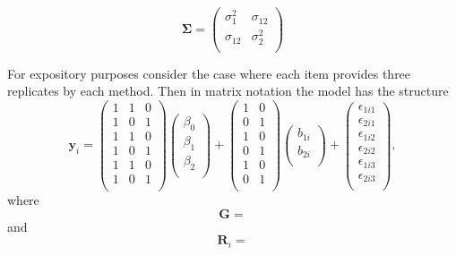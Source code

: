 \documentclass[12pt, a4paper]{report}
\theoremstyle{plain}
\theoremstyle{definition}
\theoremstyle{remark}
\begin{document}
\begin{equation}
\boldsymbol{\Sigma} = \left( \begin{array}{cc}
\sigma^2_{1} & \sigma_{12} \\
\sigma_{12} & \sigma^2_{2} \\
\end{array}\right)
\end{equation}

\vspace{1in}

For expository purposes consider the case where each item provides three replicates by each method. Then in matrix notation the model has the structure
\begin{equation}
\boldsymbol{y}_{i} =
\left(
\begin{array}{ccc}
1 & 1 & 0 \\
1 & 0 & 1 \\
1 & 1 & 0 \\
1 & 0 & 1 \\
1 & 1 & 0 \\
1 & 0 & 1 \\
\end{array}
\right)
\left(
\begin{array}{c}         \beta_0 \\ \beta_1 \\ \beta_2 \\
\end{array}
\right)
+  \left(
\begin{array}{cc}
1 & 0 \\
0 & 1 \\
1 & 0 \\
0 & 1 \\
1 & 0 \\
0 & 1 \\
\end{array}
\right)\left(
\begin{array}{c}
b_{1i} \\   b_{2i} \\
\end{array}
\right)
+
\left(
\begin{array}{c}
\epsilon_{1i1} \\
\epsilon_{2i1} \\
\epsilon_{1i2} \\
\epsilon_{2i2} \\
\epsilon_{1i3} \\
\epsilon_{2i3} \\
\end{array}
\right) ,
\end{equation}
where
\[
\boldsymbol{G} =
\]
and
\[
\boldsymbol{R}_i =
\]
\end{document}
